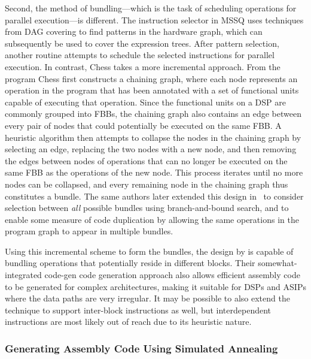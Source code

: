 Second, the method of \gls{bundling}---which is the task of scheduling
operations for parallel execution---is different.
%
The \gls{instruction
  selector} in \gls{MSSQ} uses techniques from \gls{DAG covering} to find
\glspl{pattern} in the hardware \gls{graph}, which can subsequently be used to
cover the \glspl{expression tree}.
%
After \gls{pattern selection}, another routine
attempts to schedule the selected \glspl{instruction} for parallel execution.
%
In
contrast, \gls{Chess} takes a more incremental approach.
%
From the \gls{program}
\gls{Chess} first constructs a \gls{chaining graph}, where each \gls{node}
represents an operation in the \gls{program} that has been annotated with a set
of functional units capable of executing that operation.
%
Since the functional
units on a \gls{DSP} are commonly grouped into \glspl{FBB}, the \gls{chaining
  graph} also contains an \gls{edge} between every pair of \glspl{node} that
could potentially be executed on the same \gls{FBB}.
%
A heuristic algorithm then
attempts to collapse the \glspl{node} in the \gls{chaining graph} by selecting
an \gls{edge}, replacing the two \glspl{node} with a new \gls{node}, and then
removing the \glspl{edge} between \glspl{node} of operations that can no longer
be executed on the same \gls{FBB} as the operations of the new \gls{node}.
%
This
process iterates until no more \glspl{node} can be collapsed, and every
remaining \gls{node} in the \gls{chaining graph} thus constitutes a
\gls{bundle}.
%
The same authors later extended this design in~\cite{VanPraet2001}
to consider selection between \emph{all} possible \glspl{bundle} using
\gls{branch-and-bound search}, and to enable some measure of code duplication by
allowing the same operations in the \gls{program graph} to appear in multiple
\glspl{bundle}.

Using this incremental scheme to form the \glspl{bundle}, the design by
\citeauthor{VanPraet1994} is capable of \gls{bundling} operations that
potentially reside in different \glspl{block}.
%
Their somewhat-\gls{integrated
  code-gen} \gls{code generation} approach also allows efficient \gls{assembly
  code} to be generated for complex architectures, making it suitable for
\glspl{DSP} and \glspl{ASIP} where the data paths are very irregular.
%
It may be
possible to also extend the technique to support \glspl{inter-block instruction}
as well, but \glspl{interdependent instruction} are most likely out of reach due
to its heuristic nature.


\subsubsection{Generating Assembly Code Using Simulated Annealing}

